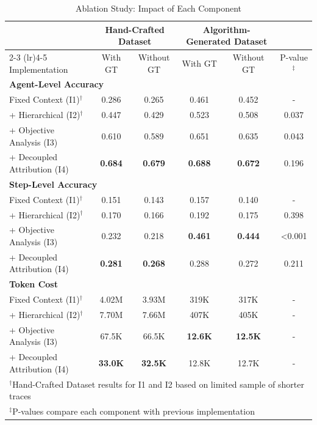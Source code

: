 \documentclass{article}
\begin{document}
\begin{table}[t]
\caption{Ablation Study: Impact of Each Component}
\label{tab:ablation-combined}
\centering
\small
\begin{tabular}{lccccc}
\toprule
& \multicolumn{2}{c}{Hand-Crafted Dataset} & \multicolumn{2}{c}{Algorithm-Generated Dataset} & \\
\cmidrule(lr){2-3} \cmidrule(lr){4-5}
Implementation & With GT & Without GT & With GT & Without GT & P-value$^{\ddagger}$ \\
\midrule
\multicolumn{6}{l}{\textbf{Agent-Level Accuracy}} \\
Fixed Context (I1)$^{\dagger}$ & 0.286 & 0.265 & 0.461 & 0.452 & - \\
+ Hierarchical (I2)$^{\dagger}$ & 0.447 & 0.429 & 0.523 & 0.508 & 0.037 \\
+ Objective Analysis (I3) & 0.610 & 0.589 & 0.651 & 0.635 & 0.043 \\
+ Decoupled Attribution (I4) & \textbf{0.684} & \textbf{0.679} & \textbf{0.688} & \textbf{0.672} & 0.196 \\
\midrule
\multicolumn{6}{l}{\textbf{Step-Level Accuracy}} \\
Fixed Context (I1)$^{\dagger}$ & 0.151 & 0.143 & 0.157 & 0.140 & - \\
+ Hierarchical (I2)$^{\dagger}$ & 0.170 & 0.166 & 0.192 & 0.175 & 0.398 \\
+ Objective Analysis (I3) & 0.232 & 0.218 & \textbf{0.461} & \textbf{0.444} & <0.001 \\
+ Decoupled Attribution (I4) & \textbf{0.281} & \textbf{0.268} & 0.288 & 0.272 & 0.211 \\
\midrule
\multicolumn{6}{l}{\textbf{Token Cost}} \\
Fixed Context (I1)$^{\dagger}$ & 4.02M & 3.93M & 319K & 317K & - \\
+ Hierarchical (I2)$^{\dagger}$ & 7.70M & 7.66M & 407K & 405K & - \\
+ Objective Analysis (I3) & 67.5K & 66.5K & \textbf{12.6K} & \textbf{12.5K} & - \\
+ Decoupled Attribution (I4) & \textbf{33.0K} & \textbf{32.5K} & 12.8K & 12.7K & - \\
\bottomrule
\multicolumn{6}{l}{\small $^{\dagger}$Hand-Crafted Dataset results for I1 and I2 based on limited sample of shorter traces} \\
\multicolumn{6}{l}{\small $^{\ddagger}$P-values compare each component with previous implementation} \\
\end{tabular}
\end{table}
\end{document}
